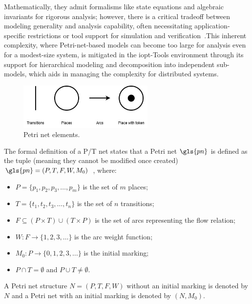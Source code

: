  Mathematically, they admit formalisms like state equations and algebraic invariants for rigorous analysis; however, there is a critical tradeoff between modeling generality and analysis capability, often necessitating application‐specific restrictions or tool support for simulation and verification~\cite{murata}.This inherent complexity, where Petri-net-based models can become too large for analysis even for a modest-size system, is mitigated in the \gls{iopt}-Tools environment through its support for hierarchical modeling and decomposition into independent sub-models, which aids in managing the complexity for distributed systems.


\begin{figure}[htbp]
  \centering
  \includegraphics[width=0.6\textwidth]{Chapters/Figures/petri_image.jpg}
  \caption{Petri net elements.}
  \label{fig:petri_diagrama}
\end{figure}



The formal definition of a P/T net states that a Petri net \( \gls{pn} \) is defined as the tuple (meaning they cannot be modified once created) \( \gls{pn} = (P, T, F, W, M_0) \)~\cite{murata}, where:


\begin{itemize}
    \item \( P = \{ p_1, p_2, p_3, \ldots, p_m \} \) is the set of \( m \) places;
    \item \( T = \{ t_1, t_2, t_3, \ldots, t_n \} \) is the set of \( n \) transitions;
    \item \( F \subseteq (P \times T) \cup (T \times P) \) is the set of arcs representing the flow relation;
    \item \( W : F \to \{1,2,3,\ldots\} \) is the arc weight function;
    \item \( M_0 : P \to \{0,1,2,3,\ldots\} \) is the initial marking;
    \item \( P \cap T = \emptyset \) and \( P \cup T \neq \emptyset \).
\end{itemize}

A Petri net structure \( N = (P, T, F, W) \) without an initial marking is denoted by \( N \) and a Petri net with an initial marking is denoted by \( (N, M_0) \).


